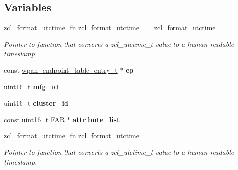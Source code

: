 \subsection*{Variables}
\begin{DoxyCompactItemize}
\item 
zcl\+\_\+format\+\_\+utctime\+\_\+fn \hyperlink{group__zcl__client_gaece15f78359a3bae016be1d24e7d9ad9}{zcl\+\_\+format\+\_\+utctime} = \hyperlink{group__zcl__client_gab6b575402b7ce107943e7d7c29499559}{\+\_\+zcl\+\_\+format\+\_\+utctime}
\begin{DoxyCompactList}\small\item\em Pointer to function that converts a zcl\+\_\+utctime\+\_\+t value to a human-\/readable timestamp. \end{DoxyCompactList}\item 
\mbox{\label{group__zcl__client_ga459df22e40148e87ee6e57ec5cc3233a}} 
const \hyperlink{structwpan__endpoint__table__entry__t}{wpan\+\_\+endpoint\+\_\+table\+\_\+entry\+\_\+t} $\ast$ {\bfseries ep}
\item 
\mbox{\label{group__zcl__client_ga2ca485436d30af714cc277eaac216cae}} 
\hyperlink{group__hal__dos_ga5a8b2dc9e45a9ee81a94ef304fb62505}{uint16\+\_\+t} {\bfseries mfg\+\_\+id}
\item 
\mbox{\label{group__zcl__client_ga262a92f94287e77cb56350951893bae2}} 
\hyperlink{group__hal__dos_ga5a8b2dc9e45a9ee81a94ef304fb62505}{uint16\+\_\+t} {\bfseries cluster\+\_\+id}
\item 
\mbox{\label{group__zcl__client_ga4dc4f61b6b33cb99330d56098bb9bf2a}} 
const \hyperlink{group__hal__dos_ga5a8b2dc9e45a9ee81a94ef304fb62505}{uint16\+\_\+t} \hyperlink{group__hal_gaef060b3456fdcc093a7210a762d5f2ed}{F\+AR} $\ast$ {\bfseries attribute\+\_\+list}
\item 
zcl\+\_\+format\+\_\+utctime\+\_\+fn \hyperlink{group__zcl__client_gaece15f78359a3bae016be1d24e7d9ad9}{zcl\+\_\+format\+\_\+utctime}
\begin{DoxyCompactList}\small\item\em Pointer to function that converts a zcl\+\_\+utctime\+\_\+t value to a human-\/readable timestamp. \end{DoxyCompactList}\end{DoxyCompactItemize}


